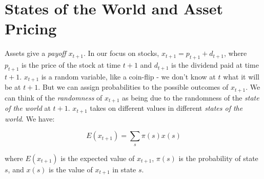 \chapter{States of the World and Asset Pricing}

Assets give a \textit{payoff} $x_{t+1}$. In our focus on stocks, 
$x_{t+1} = p_{t+1} + d_{t+1}$, where $p_{t+1}$ is the 
price of the stock at time $t+1$ and $d_{t+1}$ 
is the dividend paid at time $t+1$.
$x_{t+1}$ is a random variable, like a coin-flip - we don't 
know at $t$ what it will be at $t+1$. But we can assign 
probabilities to the possible outcomes of $x_{t+1}$.
We can think of the \textit{randomness} of $x_{t+1}$ as being
due to the randomness of the \textit{state of the world} at $t+1$.
$x_{t+1}$ takes on different values in 
different \textit{states of the world}.
We have:

\begin{equation}
    E(x_{t+1}) = \sum_s \pi(s) x(s)
\end{equation}

where $E(x_{t+1})$ is the expected value of $x_{t+1}$,
$\pi(s)$ is the probability of state $s$, and $x(s)$ is the
value of $x_{t+1}$ in state $s$.

